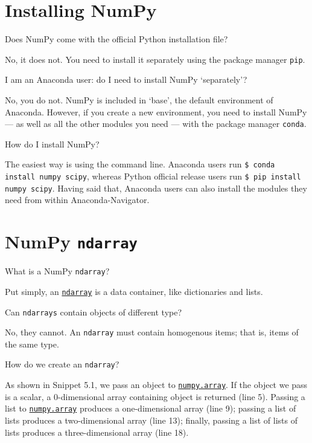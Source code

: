 \documentclass[a4paper,11pt]{book}
\numberwithin{figure}{chapter}
\numberwithin{table}{chapter}
\newcommand{\question}[1]{%
    \begin{tcolorbox}[colback=comp_c!10,colframe=comp_c,sidebyside align=top,width=\linewidth,before skip=1ex]
        #1
    \end{tcolorbox}
    \switchcolumn%
}
\newcommand{\note}[1]{%
    \begin{tcolorbox}[colback=white!0,colframe=white!10,width=\linewidth,before skip=1ex]
        #1
    \end{tcolorbox}
}
\begin{document}
\vspace{1em}

\section{Installing NumPy}

\begin{paracol}{2}
	\question{\raggedright Does NumPy come with the official Python installation file?}
	\note{No, it does not. You need to install it separately using the package manager \texttt{pip}.}
\end{paracol}

\begin{paracol}{2}
	\question{\raggedright I am an Anaconda user: do I need to install NumPy `separately'?}
	\note{No, you do not. NumPy is included in `base', the default environment of Anaconda. However, if you create a new environment, you need to install NumPy --- as well as all the other modules you need --- with the package manager \texttt{conda}.}
\end{paracol}

\begin{paracol}{2}
	\question{\raggedright How do I install NumPy?}
	\note{The easiest way is using the command line. Anaconda users run \texttt{\$ conda install numpy scipy}, whereas Python official release users run \texttt{\$ pip install numpy scipy}. Having said that, Anaconda users can also install the modules they need from within Anaconda-Navigator.}
\end{paracol}

\section{NumPy \texttt{ndarray}}

\begin{paracol}{2}
	\question{\raggedright What is a NumPy \texttt{ndarray}?}
	\note{Put simply, an \href{https://numpy.org/doc/stable/reference/arrays.ndarray.html}{\texttt{ndarray}} is a data container, like dictionaries and lists.}
\end{paracol}

\begin{paracol}{2}
	\question{\raggedright Can \texttt{ndarrays} contain objects of different type?}
	\note{No, they cannot. An \texttt{ndarray} must contain homogenous items; that is, items of the same type.}
\end{paracol}

\begin{paracol}{2}
	\question{\raggedright How do we create an \texttt{ndarray}?}
	\note{As shown in Snippet 5.1, we pass an object to \href{https://numpy.org/doc/stable/reference/generated/numpy.array.html\#numpy.array}{\texttt{numpy.array}}. If the object we pass is a scalar, a 0-dimensional array containing object is returned (line 5). Passing a list to \href{https://numpy.org/doc/stable/reference/generated/numpy.array.html\#numpy.array}{\texttt{numpy.array}} produces a one-dimensional array (line 9); passing a list of lists produces a two-dimensional array (line 13); finally, passing a list of lists of lists produces a three-dimensional array (line 18).}
\end{paracol}
\end{document}
